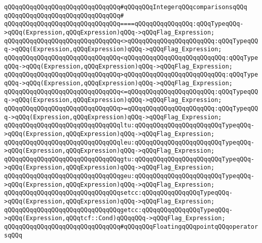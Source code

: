 \newline
\verb|qQQqqQQqqQQqqQQqqQQqqQQqqQQqqQQq#qQQqqQQqIntegerqQQqcomparisonsqQQq|\newline
\verb|qQQqqQQqqQQqqQQqqQQqqQQqqQQqqQQq#|\newline
\verb|qQQqqQQqqQQqqQQqqQQqqQQqqQQqqQQq====qQQqqQQqqQQqqQQq:qQQqTypeqQQq->qQQq(Expression,qQQqExpression)qQQq->qQQqFlag_Expression;|\newline
\verb|qQQqqQQqqQQqqQQqqQQqqQQqqQQqqQQq<>qQQqqQQqqQQqqQQqqQQqqQQq:qQQqTypeqQQq->qQQq(Expression,qQQqExpression)qQQq->qQQqFlag_Expression;|\newline
\verb|qQQqqQQqqQQqqQQqqQQqqQQqqQQqqQQq<qQQqqQQqqQQqqQQqqQQqqQQqqQQq:qQQqTypeqQQq->qQQq(Expression,qQQqExpression)qQQq->qQQqFlag_Expression;|\newline
\verb|qQQqqQQqqQQqqQQqqQQqqQQqqQQqqQQq>qQQqqQQqqQQqqQQqqQQqqQQqqQQq:qQQqTypeqQQq->qQQq(Expression,qQQqExpression)qQQq->qQQqFlag_Expression;|\newline
\verb|qQQqqQQqqQQqqQQqqQQqqQQqqQQqqQQq<=qQQqqQQqqQQqqQQqqQQqqQQq:qQQqTypeqQQq->qQQq(Expression,qQQqExpression)qQQq->qQQqFlag_Expression;|\newline
\verb|qQQqqQQqqQQqqQQqqQQqqQQqqQQqqQQq>=qQQqqQQqqQQqqQQqqQQqqQQq:qQQqTypeqQQq->qQQq(Expression,qQQqExpression)qQQq->qQQqFlag_Expression;|\newline
\verb|qQQqqQQqqQQqqQQqqQQqqQQqqQQqqQQqltu:qQQqqQQqqQQqqQQqqQQqqQQqTypeqQQq->qQQq(Expression,qQQqExpression)qQQq->qQQqFlag_Expression;|\newline
\verb|qQQqqQQqqQQqqQQqqQQqqQQqqQQqqQQqleu:qQQqqQQqqQQqqQQqqQQqqQQqTypeqQQq->qQQq(Expression,qQQqExpression)qQQq->qQQqFlag_Expression;|\newline
\verb|qQQqqQQqqQQqqQQqqQQqqQQqqQQqqQQqgtu:qQQqqQQqqQQqqQQqqQQqqQQqTypeqQQq->qQQq(Expression,qQQqExpression)qQQq->qQQqFlag_Expression;|\newline
\verb|qQQqqQQqqQQqqQQqqQQqqQQqqQQqqQQqgeu:qQQqqQQqqQQqqQQqqQQqqQQqTypeqQQq->qQQq(Expression,qQQqExpression)qQQq->qQQqFlag_Expression;|\newline
\verb|qQQqqQQqqQQqqQQqqQQqqQQqqQQqqQQqsetcc:qQQqqQQqqQQqqQQqTypeqQQq->qQQq(Expression,qQQqExpression)qQQq->qQQqFlag_Expression;|\newline
\verb|qQQqqQQqqQQqqQQqqQQqqQQqqQQqqQQqgetcc:qQQqqQQqqQQqqQQqTypeqQQq->qQQq(Expression,qQQqtcf::Cond)qQQqqQQq->qQQqFlag_Expression;|\newline
\newline
\verb|qQQqqQQqqQQqqQQqqQQqqQQqqQQqqQQq#qQQqqQQqFloatingqQQqpointqQQqoperatorsqQQq|\newline
